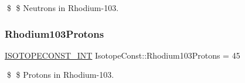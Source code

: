 \$ \$ Neutrons in Rhodium-\/103. \mbox{\label{group___isotope_const-_rhodium-_rh103_ga334c12909e33cdf4f2a0bf1ecdf8a380}} 
\subsubsection{\texorpdfstring{Rhodium103\+Protons}{Rhodium103Protons}}
{\footnotesize\ttfamily \mbox{\hyperlink{group___isotope_const-_macros_ga5f18360b3e99483a35c32d789e62621c}{I\+S\+O\+T\+O\+P\+E\+C\+O\+N\+S\+T\+\_\+\+I\+NT}} Isotope\+Const\+::\+Rhodium103\+Protons = 45}

\$ \$ Protons in Rhodium-\/103. 